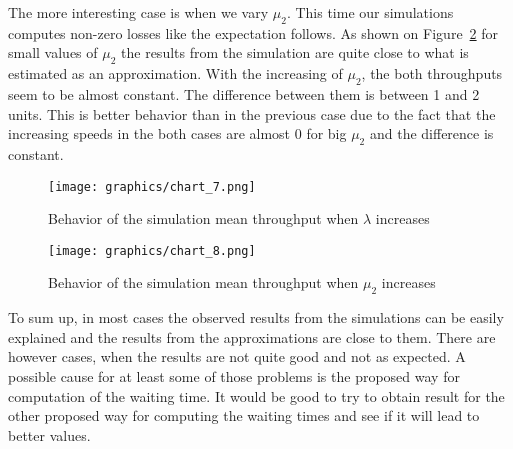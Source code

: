 \documentclass[12pt]{article}
\theoremstyle{plain}
\begin{document}
The more interesting case is when we vary $\mu_2$. This time our simulations
computes non-zero losses like the expectation follows. As shown on Figure~\ref{fig:throughput2}
for small values of $\mu_2$ the results from the simulation are quite close to
what is estimated as an approximation. With the increasing of $\mu_2$, the both
throughputs seem to be almost constant. The difference between them is between 1
and 2 units. This is better behavior than in the previous case due to the fact
that the increasing speeds in the both cases are almost 0 for big $\mu_2$ and the
difference is constant.

\begin{figure}[h]
  \caption{Behavior of the simulation mean throughput when $\lambda$ increases}
  \texttt{[image: graphics/chart\_7.png]}\\
  \label{fig:throughput1}
\end{figure}

\begin{figure}[h]
  \caption{Behavior of the simulation mean throughput when $\mu_2$ increases}
  \texttt{[image: graphics/chart\_8.png]}\\
  \label{fig:throughput2}
\end{figure}

To sum up, in most cases the observed results from the simulations can be easily
explained and the results from the approximations are close to them. There are
however cases, when the results are not quite good and not as expected. A
possible cause for at least some of those problems is the proposed way for
computation of the waiting time. It would be good to try to obtain result for the other
proposed way for computing the waiting times and see if it will lead to better
values.
\end{document}
